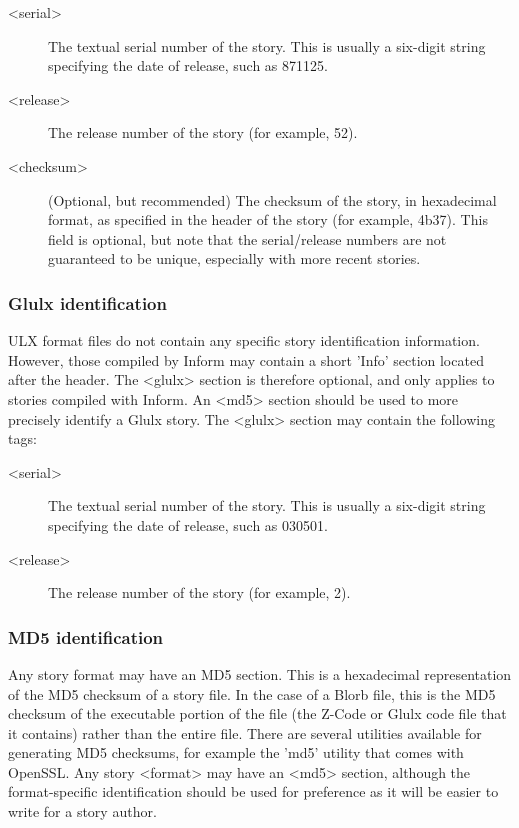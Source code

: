 \documentclass[a4paper,11pt]{article}
\begin{document}
\begin{description}
\item[<serial>] The textual serial number of the story. This is usually a six-digit string
specifying the date of release, such as 871125.
\item[<release>] The release number of the story (for example, 52).
\item[<checksum>] (Optional, but recommended) The checksum of the story, in 
hexadecimal format, as specified in the header of the story (for example, 4b37). This field is 
optional, but note that the serial/release numbers are not guaranteed to be unique, especially 
with more recent stories.
\end{description}

\subsubsection{Glulx identification}

ULX format files do not contain any specific story identification information. However,
those compiled by Inform may contain a short 'Info' section located after the header. The
<glulx> section is therefore optional, and only applies to stories compiled with Inform.
An <md5> section should be used to more precisely identify a Glulx story. The <glulx>
section may contain the following tags:

\begin{description}
\item[<serial>] The textual serial number of the story. This is usually a six-digit string
specifying the date of release, such as 030501.
\item[<release>] The release number of the story (for example, 2).
\end{description}

\subsubsection{MD5 identification}

Any story format may have an MD5 section. This is a hexadecimal representation of the
MD5 checksum of a story file. In the case of a Blorb file, this is the MD5 checksum of
the executable portion of the file (the Z-Code or Glulx code file that it contains) rather
than the entire file. There are several utilities available for generating MD5 checksums,
for example the 'md5' utility that comes with OpenSSL. Any story <format> may have
an <md5> section, although the format-specific identification should be used for preference
as it will be easier to write for a story author.
\end{document}
